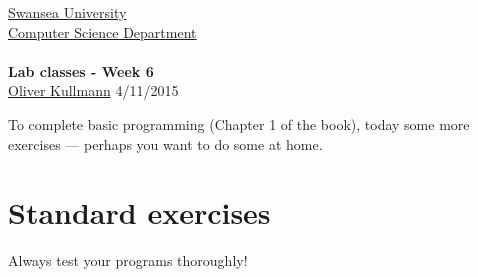 \documentclass[11pt]{article}
\newcommand{\Java}{\lstset{language=Java,keywordstyle=\bfseries,breaklines,breakindent=30pt}}
\begin{document}
\begin{center}
  \href{http://www.swan.ac.uk/}{Swansea University}\\
  \href{http://www.swan.ac.uk/compsci/}{Computer Science Department}\\[1ex]
  \href{\chp}{\module}\\[1ex]
  \textbf{Lab classes - Week 6}\\
  \href{http://cs.swan.ac.uk/~csoliver}{Oliver Kullmann} 4/11/2015
\end{center}


To complete basic programming (Chapter 1 of the book), today some more exercises --- perhaps you want to do some at home.


\section{Standard exercises}
\label{sec:stdex}

\Java

Always test your programs thoroughly!
\end{document}
